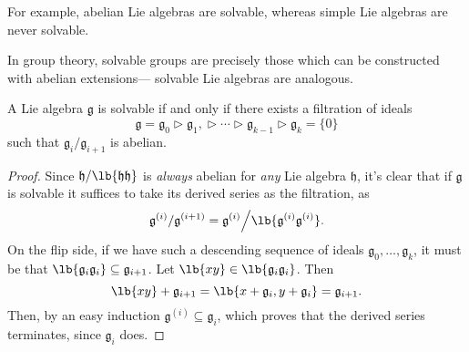 \documentclass{article}
\newcommand*\tge{\ensuremath{\mathrel{\rhd}}}
\DeclarePairedDelimiter\lb\lbrack\rbrack
\newcommand*\frkg{{\ensuremath{\mathfrak{g}}}}
\newcommand*\frkh{{\ensuremath{\mathfrak{h}}}}
\begin{document}
For example, abelian Lie algebras are solvable, whereas simple Lie algebras are never solvable.

In group theory, solvable groups are precisely those which can be constructed with abelian extensions--- solvable Lie algebras are analogous.

\begin{proposition}
    A Lie algebra $\frkg$ is solvable if and only if there exists a filtration of ideals
    \[
        \frkg = \frkg_0 \tge \frkg_1, \tge \cdots \tge \frkg_{k-1} \tge \frkg_k = \{0\}
    \]
    such that $\frkg_i / \frkg_{i+1}$ is abelian.
\end{proposition}

\begin{proof}
    Since $\frkh/\lb{\frkh\frkh}$ is \textit{always} abelian for \textit{any} Lie algebra $\frkh$, it's clear that if $\frkg$ is solvable it suffices to take its derived series as the filtration, as
    \[
        \frkg^{(i)}/\frkg^{(i+1)}
        =
        \frkg^{(i)}\Big/\lb{\frkg^{(i)}\frkg^{(i)}}.
    \]
    On the flip side, if we have such a descending sequence of ideals $\frkg_0, \ldots, \frkg_k$, it must be that $\lb{\frkg_i\frkg_i} \subseteq \frkg_{i+1}$. 
    Let $\lb{xy} \in \lb{\frkg_i\frkg_i}$.
    Then
    \[
        \lb{xy} + \frkg_{i+1}
        =
        \lb{x + \frkg_i, y + \frkg_i}
        =
        \frkg_{i+1}.
    \]
    Then, by an easy induction $\frkg^{(i)} \subseteq \frkg_i$, which proves that the derived series terminates, since $\frkg_i$ does.
\end{proof}
\end{document}
